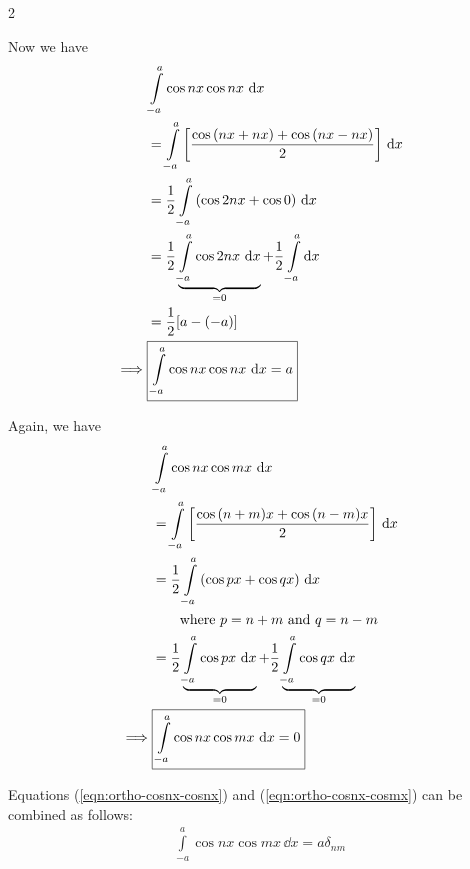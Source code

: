         \begin{multicols}{2}

            Now we have
            \begin{align}
                &\int\limits_{-a}^{a}{\cos{nx}\cos{nx}\,\dd{x}} \nonumber\\
                &=\int\limits_{-a}^{a}{\qty[\dfrac{\cos{(nx+nx)}+\cos{(nx-nx)}}{2}]\,\dd{x}} \nonumber\\
                &=\dfrac{1}{2}\int\limits_{-a}^{a}{\qty(\cos{2nx}+\cos{0})\,\dd{x}} \nonumber\\
                &=\dfrac{1}{2}\underbrace{\int\limits_{-a}^{a}{\cos{2nx}\,\dd{x}}}_{=0}+\dfrac{1}{2}\int\limits_{-a}^{a}{\dd{x}} \nonumber\\
                &=\dfrac{1}{2}\qty[a-(-a)] \nonumber\\
                \implies&\boxed{\int\limits_{-a}^{a}{\cos{nx}\cos{nx}\,\dd{x}}=a} \label{eqn:ortho-cosnx-cosnx}
            \end{align}
    
            Again, we have
            \begin{align}
                &\int\limits_{-a}^{a}{\cos{nx}\cos{mx}\,\dd{x}} \nonumber\\
                &=\int\limits_{-a}^{a}{\qty[\dfrac{\cos{(n+m)x}+\cos{(n-m)x}}{2}]\,\dd{x}} \nonumber\\
                &=\dfrac{1}{2}\int\limits_{-a}^{a}{\qty(\cos{px}+\cos{qx})\,\dd{x}} \nonumber\\
                &\qquad\text{where }p=n+m\text{ and }q=n-m \nonumber\\
                &=\dfrac{1}{2}\underbrace{\int\limits_{-a}^{a}{\cos{px}\,\dd{x}}}_{=0}+\dfrac{1}{2}\underbrace{\int\limits_{-a}^{a}{\cos{qx}\,\dd{x}}}_{=0} \nonumber\\
                \implies&\boxed{\int\limits_{-a}^{a}{\cos{nx}\cos{mx}\,\dd{x}}=0} \label{eqn:ortho-cosnx-cosmx}
            \end{align}
            
        \end{multicols}

        Equations (\ref{eqn:ortho-cosnx-cosnx}) and (\ref{eqn:ortho-cosnx-cosmx}) can be combined as follows:
        \begin{align}
            \boxed{\int\limits_{-a}^{a}{\cos{nx}\cos{mx}\,\dd{x}}=a\delta_{nm}} \label{eqn:ortho-cos}
        \end{align}

